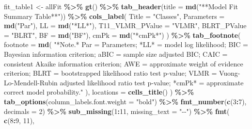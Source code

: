 \documentclass[
]{book}
\newenvironment{Shaded}{\begin{snugshade}}{\end{snugshade}}
\newcommand{\AttributeTok}[1]{\textcolor[rgb]{0.13,0.29,0.53}{#1}}
\newcommand{\DecValTok}[1]{\textcolor[rgb]{0.00,0.00,0.81}{#1}}
\newcommand{\FunctionTok}[1]{\textcolor[rgb]{0.13,0.29,0.53}{\textbf{#1}}}
\newcommand{\NormalTok}[1]{#1}
\newcommand{\OtherTok}[1]{\textcolor[rgb]{0.56,0.35,0.01}{#1}}
\newcommand{\SpecialCharTok}[1]{\textcolor[rgb]{0.81,0.36,0.00}{\textbf{#1}}}
\newcommand{\StringTok}[1]{\textcolor[rgb]{0.31,0.60,0.02}{#1}}
\begin{document}
\begin{Shaded}
\begin{Highlighting}[]
\NormalTok{fit\_table1 }\OtherTok{\textless{}{-}}\NormalTok{ allFit }\SpecialCharTok{\%\textgreater{}\%}
  \FunctionTok{gt}\NormalTok{() }\SpecialCharTok{\%\textgreater{}\%}
  \FunctionTok{tab\_header}\NormalTok{(}\AttributeTok{title =} \FunctionTok{md}\NormalTok{(}\StringTok{"**Model Fit Summary Table**"}\NormalTok{)) }\SpecialCharTok{\%\textgreater{}\%}
  \FunctionTok{cols\_label}\NormalTok{(}
    \AttributeTok{Title =} \StringTok{"Classes"}\NormalTok{,}
    \AttributeTok{Parameters =} \FunctionTok{md}\NormalTok{(}\StringTok{"Par"}\NormalTok{),}
    \AttributeTok{LL =} \FunctionTok{md}\NormalTok{(}\StringTok{"*LL*"}\NormalTok{),}
    \AttributeTok{T11\_VLMR\_PValue =} \StringTok{"VLMR"}\NormalTok{,}
    \AttributeTok{BLRT\_PValue =} \StringTok{"BLRT"}\NormalTok{,}
    \AttributeTok{BF =} \FunctionTok{md}\NormalTok{(}\StringTok{"BF"}\NormalTok{),}
    \AttributeTok{cmPk =} \FunctionTok{md}\NormalTok{(}\StringTok{"*cmPk*"}\NormalTok{)}
\NormalTok{  ) }\SpecialCharTok{\%\textgreater{}\%}
  \FunctionTok{tab\_footnote}\NormalTok{(}
    \AttributeTok{footnote =} \FunctionTok{md}\NormalTok{(}
      \StringTok{"*Note.* Par = Parameters; *LL* = model log likelihood;}
\StringTok{BIC = Bayesian information criterion;}
\StringTok{aBIC = sample size adjusted BIC; CAIC = consistent Akaike information criterion;}
\StringTok{AWE = approximate weight of evidence criterion;}
\StringTok{BLRT = bootstrapped likelihood ratio test p{-}value;}
\StringTok{VLMR = Vuong{-}Lo{-}Mendell{-}Rubin adjusted likelihood ratio test p{-}value;}
\StringTok{*cmPk* = approximate correct model probability."}
\NormalTok{    ),}
\AttributeTok{locations =} \FunctionTok{cells\_title}\NormalTok{()}
\NormalTok{  ) }\SpecialCharTok{\%\textgreater{}\%}
  \FunctionTok{tab\_options}\NormalTok{(}\AttributeTok{column\_labels.font.weight =} \StringTok{"bold"}\NormalTok{) }\SpecialCharTok{\%\textgreater{}\%}
  \FunctionTok{fmt\_number}\NormalTok{(}\FunctionTok{c}\NormalTok{(}\DecValTok{3}\SpecialCharTok{:}\DecValTok{7}\NormalTok{),}
             \AttributeTok{decimals =} \DecValTok{2}\NormalTok{) }\SpecialCharTok{\%\textgreater{}\%}
  \FunctionTok{sub\_missing}\NormalTok{(}\DecValTok{1}\SpecialCharTok{:}\DecValTok{11}\NormalTok{,}
              \AttributeTok{missing\_text =} \StringTok{"{-}{-}"}\NormalTok{) }\SpecialCharTok{\%\textgreater{}\%}
  \FunctionTok{fmt}\NormalTok{(}
    \FunctionTok{c}\NormalTok{(}\DecValTok{8}\SpecialCharTok{:}\DecValTok{9}\NormalTok{, }\DecValTok{11}\NormalTok{),}

\end{Highlighting}
\end{Shaded}
\end{document}

